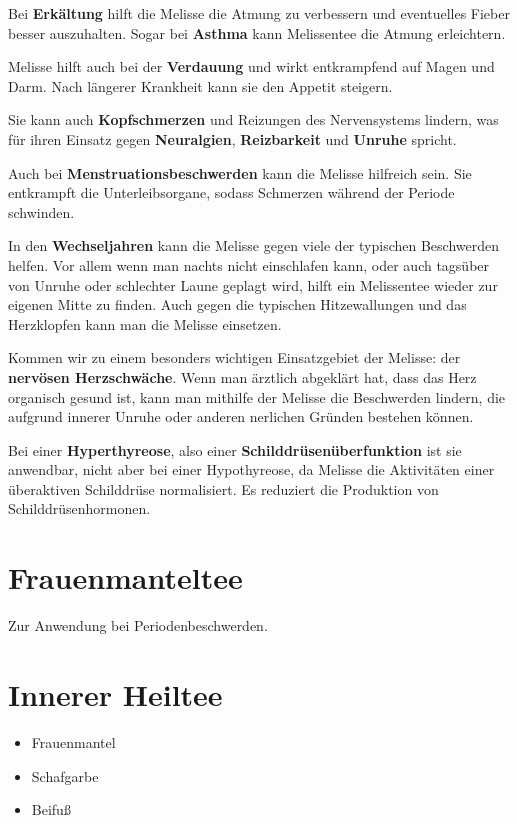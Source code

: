 Bei \textbf{Erkältung} hilft die Melisse die Atmung zu verbessern und eventuelles Fieber besser auszuhalten. Sogar bei \textbf{Asthma} kann Melissentee die Atmung erleichtern.

Melisse hilft auch bei der \textbf{Verdauung} und wirkt entkrampfend auf Magen und Darm. Nach längerer Krankheit kann sie den Appetit steigern.

Sie kann auch \textbf{Kopfschmerzen} und Reizungen des Nervensystems lindern, was für ihren Einsatz gegen \textbf{Neuralgien}, \textbf{Reizbarkeit} und \textbf{Unruhe} spricht.

Auch bei \textbf{Menstruationsbeschwerden} kann die Melisse hilfreich sein. Sie entkrampft die Unterleibsorgane, sodass Schmerzen während der Periode schwinden.

In den \textbf{Wechseljahren} kann die Melisse gegen viele der typischen Beschwerden helfen. Vor allem wenn man nachts nicht einschlafen kann, oder auch tagsüber von Unruhe oder schlechter Laune geplagt wird, hilft ein Melissentee wieder zur eigenen Mitte zu finden. Auch gegen die typischen Hitzewallungen und das Herzklopfen kann man die Melisse einsetzen.

Kommen wir zu einem besonders wichtigen Einsatzgebiet der Melisse: der \textbf{nervösen Herzschwäche}. Wenn man ärztlich abgeklärt hat, dass das Herz organisch gesund ist, kann man mithilfe der Melisse die Beschwerden lindern, die aufgrund innerer Unruhe oder anderen nerlichen Gründen bestehen können.

Bei einer \textbf{Hyperthyreose}, also einer \textbf{Schilddrüsenüberfunktion} ist sie anwendbar, nicht aber bei einer Hypothyreose, da Melisse die Aktivitäten einer überaktiven Schilddrüse normalisiert. Es reduziert die Produktion von Schilddrüsenhormonen.




\newpage


\section{Frauenmanteltee}
\label{   }


Zur Anwendung bei Periodenbeschwerden.

 



\newpage


\section{Innerer Heiltee}
\label{   }


\begin{itemize}
	\item Frauenmantel 
	\item Schafgarbe
	\item Beifuß
\end{itemize}



